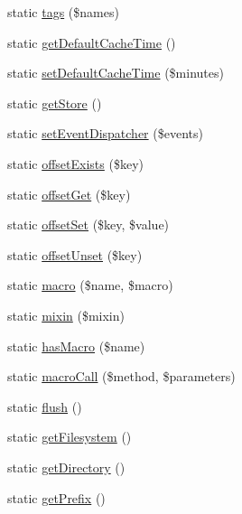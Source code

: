 \begin{DoxyCompactItemize}
\item 
static \mbox{\hyperlink{class_illuminate_1_1_support_1_1_facades_1_1_cache_a1d88420b147e30e153a7f22aeefc42a8}{tags}} (\$names)
\item 
static \mbox{\hyperlink{class_illuminate_1_1_support_1_1_facades_1_1_cache_ac00588a31484814762860326d0bd20a1}{get\+Default\+Cache\+Time}} ()
\item 
static \mbox{\hyperlink{class_illuminate_1_1_support_1_1_facades_1_1_cache_a778dc87a9a89af6e7efcaa6d264d3e4b}{set\+Default\+Cache\+Time}} (\$minutes)
\item 
static \mbox{\hyperlink{class_illuminate_1_1_support_1_1_facades_1_1_cache_a92e60124c2a55214d9692a14bdfa1083}{get\+Store}} ()
\item 
static \mbox{\hyperlink{class_illuminate_1_1_support_1_1_facades_1_1_cache_aac5b4b794ac19fbd44e66d46a9e298ba}{set\+Event\+Dispatcher}} (\$events)
\item 
static \mbox{\hyperlink{class_illuminate_1_1_support_1_1_facades_1_1_cache_a06b6deee91c4b1543fca7416885614f2}{offset\+Exists}} (\$key)
\item 
static \mbox{\hyperlink{class_illuminate_1_1_support_1_1_facades_1_1_cache_ac1f18c1895c1879f4759dfadbe63f7df}{offset\+Get}} (\$key)
\item 
static \mbox{\hyperlink{class_illuminate_1_1_support_1_1_facades_1_1_cache_a51056a380e3d655397251c75bbe34c79}{offset\+Set}} (\$key, \$value)
\item 
static \mbox{\hyperlink{class_illuminate_1_1_support_1_1_facades_1_1_cache_a41dc27b1a2a2ab6c69be0550627ebadf}{offset\+Unset}} (\$key)
\item 
static \mbox{\hyperlink{class_illuminate_1_1_support_1_1_facades_1_1_cache_a55a38c2032c537bbee8835736477e051}{macro}} (\$name, \$macro)
\item 
static \mbox{\hyperlink{class_illuminate_1_1_support_1_1_facades_1_1_cache_a7478b2077250bc5d8e79df6450914e55}{mixin}} (\$mixin)
\item 
static \mbox{\hyperlink{class_illuminate_1_1_support_1_1_facades_1_1_cache_ab77431154c802f667267725a67d81de9}{has\+Macro}} (\$name)
\item 
static \mbox{\hyperlink{class_illuminate_1_1_support_1_1_facades_1_1_cache_a6e137ad51d66f934dd10a880c36f1abb}{macro\+Call}} (\$method, \$parameters)
\item 
static \mbox{\hyperlink{class_illuminate_1_1_support_1_1_facades_1_1_cache_ad105f7d6cd0231543aeb58eea214149f}{flush}} ()
\item 
static \mbox{\hyperlink{class_illuminate_1_1_support_1_1_facades_1_1_cache_accbbacb3b8c964be370c343ec31724b2}{get\+Filesystem}} ()
\item 
static \mbox{\hyperlink{class_illuminate_1_1_support_1_1_facades_1_1_cache_a24345561ebd16cc82568f5d6dc32d753}{get\+Directory}} ()
\item 
static \mbox{\hyperlink{class_illuminate_1_1_support_1_1_facades_1_1_cache_aafd084ec4353419c5e807c1eac406bb4}{get\+Prefix}} ()
\end{DoxyCompactItemize}


